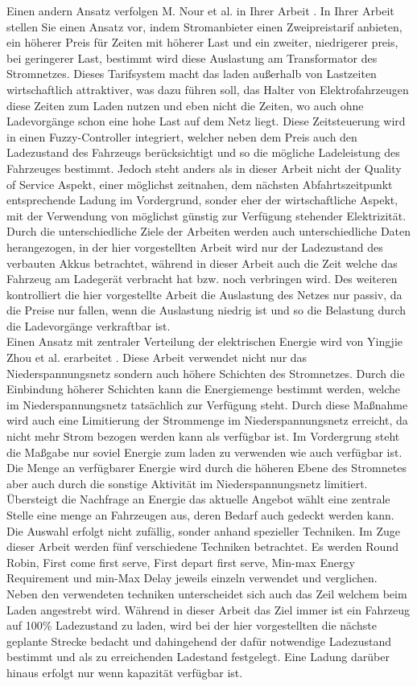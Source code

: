 Einen andern Ansatz verfolgen M. Nour et al. in Ihrer Arbeit \cite{RW_2_1}. In Ihrer Arbeit stellen Sie einen Ansatz vor, indem Stromanbieter einen Zweipreistarif anbieten, ein höherer Preis für Zeiten mit höherer Last und ein zweiter, niedrigerer preis, bei geringerer Last, bestimmt wird diese Auslastung am Transformator des Stromnetzes. Dieses Tarifsystem macht das laden außerhalb von Lastzeiten wirtschaftlich attraktiver, was dazu führen soll, das Halter von Elektrofahrzeugen diese Zeiten zum Laden nutzen und eben nicht die Zeiten, wo auch ohne Ladevorgänge schon eine hohe Last auf dem Netz liegt. Diese Zeitsteuerung wird in einen Fuzzy-Controller integriert, welcher neben dem Preis auch den Ladezustand des Fahrzeugs berücksichtigt und so die mögliche Ladeleistung des Fahrzeuges bestimmt. Jedoch steht anders als in dieser Arbeit nicht der Quality of Service Aspekt, einer möglichst zeitnahen,  dem nächsten Abfahrtszeitpunkt entsprechende Ladung im Vordergrund, sonder eher der wirtschaftliche Aspekt, mit der Verwendung von möglichst günstig zur Verfügung stehender Elektrizität. Durch die unterschiedliche Ziele der Arbeiten werden auch unterschiedliche Daten herangezogen, in der hier vorgestellten Arbeit wird nur der Ladezustand des verbauten Akkus betrachtet, während in dieser Arbeit auch die Zeit welche das Fahrzeug am Ladegerät verbracht hat bzw. noch verbringen wird. Des weiteren kontrolliert die hier vorgestellte Arbeit die Auslastung des Netzes nur passiv, da die Preise nur fallen, wenn die Auslastung niedrig ist und so die Belastung durch die Ladevorgänge verkraftbar ist.\\
Einen Ansatz mit zentraler Verteilung der elektrischen Energie wird von Yingjie Zhou et al. erarbeitet \cite{RWcentral}. Diese Arbeit verwendet nicht nur das Niederspannungsnetz sondern auch höhere Schichten des Stromnetzes. Durch die Einbindung höherer Schichten kann die Energiemenge bestimmt werden, welche im Niederspannungsnetz tatsächlich zur Verfügung steht. Durch diese Maßnahme wird auch eine Limitierung der Strommenge im Niederspannungsnetz erreicht, da nicht mehr Strom bezogen werden kann als verfügbar ist. Im Vordergrung steht die Maßgabe nur soviel Energie zum laden zu verwenden wie auch verfügbar ist. Die Menge an verfügbarer Energie wird durch die höheren Ebene des Stromnetes aber auch durch die sonstige Aktivität im Niederspannungsnetz limitiert. Übersteigt die Nachfrage an Energie das aktuelle Angebot wählt eine zentrale Stelle eine menge an Fahrzeugen aus, deren Bedarf auch gedeckt werden kann. Die Auswahl erfolgt nicht zufällig, sonder anhand spezieller Techniken. Im Zuge dieser Arbeit werden fünf verschiedene Techniken betrachtet. Es werden Round Robin, First come first serve, First depart first serve, Min-max Energy Requirement und min-Max Delay jeweils einzeln verwendet und verglichen. Neben den verwendeten techniken unterscheidet sich auch das Zeil welchem beim Laden angestrebt wird. Während in dieser Arbeit das Ziel immer ist ein Fahrzeug auf 100\% Ladezustand zu laden, wird bei der hier vorgestellten die nächste geplante Strecke bedacht und dahingehend der dafür notwendige Ladezustand bestimmt und als zu erreichenden Ladestand festgelegt. Eine Ladung darüber hinaus erfolgt nur wenn kapazität verfügbar ist.




